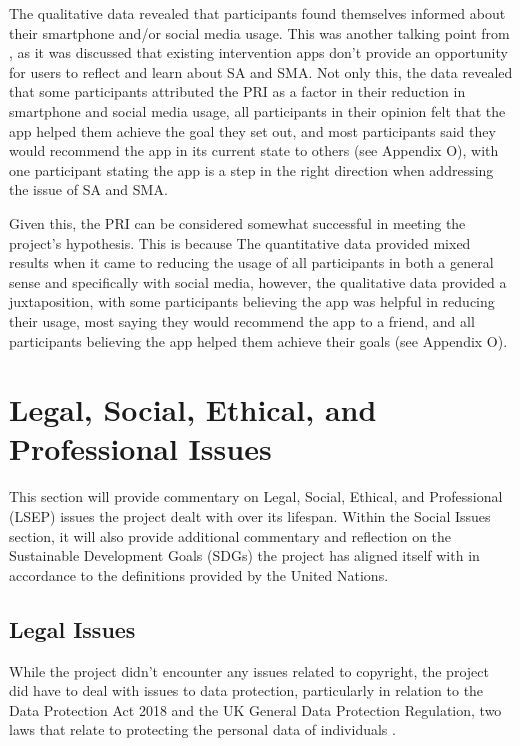 \documentclass[12pt]{article}
\begin{document}
The qualitative data revealed that participants found themselves informed about their smartphone and/or social media usage. This was another talking point from 
\textcite{RefWorks:RefID:35-dosselaar2017smartphone}, as it was discussed that existing intervention apps don't provide an opportunity for users to reflect and learn about SA and SMA. Not only this,
the data revealed that some participants attributed the PRI as a factor in their reduction in smartphone and social media usage, all participants in their opinion felt that the app
helped them achieve the goal they set out, and most participants said they would recommend the app in its current state to others (see Appendix O), with one participant stating the app is a 
step in the right direction when addressing the issue of SA and SMA.\newline

Given this, the PRI can be considered somewhat successful in meeting the project's hypothesis. This is because The quantitative data provided mixed results when it came to reducing the 
usage of all participants in both a general sense and specifically with social media, however, the qualitative data provided a juxtaposition, with some participants believing the app was 
helpful in reducing their usage, most saying they would recommend the app to a friend, and all participants believing the app helped them achieve their goals (see Appendix O).


\newpage


\section{Legal, Social, Ethical, and Professional Issues}
This section will provide commentary on Legal, Social, Ethical, and Professional (LSEP) issues the project dealt with over its lifespan.
Within the Social Issues section, it will also provide additional commentary and reflection on the Sustainable Development Goals (SDGs)
the project has aligned itself with in accordance to the definitions provided by the United Nations. 

\subsection{Legal Issues}
While the project didn't encounter any issues related to copyright, the project did have to deal with issues to data protection, particularly in
relation to the Data Protection Act 2018 and the UK General Data Protection Regulation, two laws that relate to protecting the personal data of
individuals \autocite{RefWorks:RefID:174-phillips2021uk}. \newline
\end{document}
